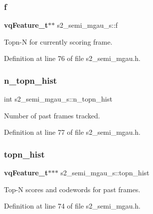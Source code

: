 \mbox{\label{structs2__semi__mgau__s_ad8cb7f058bcc7402dd6a41c61f1b26e5}} 
\subsubsection{f}
{\footnotesize\ttfamily \textbf{ vq\+Feature\+\_\+t}$\ast$$\ast$ s2\+\_\+semi\+\_\+mgau\+\_\+s\+::f}



Topn-\/N for currently scoring frame. 



Definition at line 76 of file s2\+\_\+semi\+\_\+mgau.\+h.

\mbox{\label{structs2__semi__mgau__s_a3cbc9fe683da5b7befe6b2712adae327}} 
\subsubsection{n\+\_\+topn\+\_\+hist}
{\footnotesize\ttfamily int s2\+\_\+semi\+\_\+mgau\+\_\+s\+::n\+\_\+topn\+\_\+hist}



Number of past frames tracked. 



Definition at line 77 of file s2\+\_\+semi\+\_\+mgau.\+h.

\mbox{\label{structs2__semi__mgau__s_a8892e22acbf81b08972cb6d7968ed4ce}} 
\subsubsection{topn\+\_\+hist}
{\footnotesize\ttfamily \textbf{ vq\+Feature\+\_\+t}$\ast$$\ast$$\ast$ s2\+\_\+semi\+\_\+mgau\+\_\+s\+::topn\+\_\+hist}



Top-\/N scores and codewords for past frames. 



Definition at line 74 of file s2\+\_\+semi\+\_\+mgau.\+h.

\mbox{\label{structs2__semi__mgau__s_acfe1e5d43a25418ef19afba837f85cf7}} 
